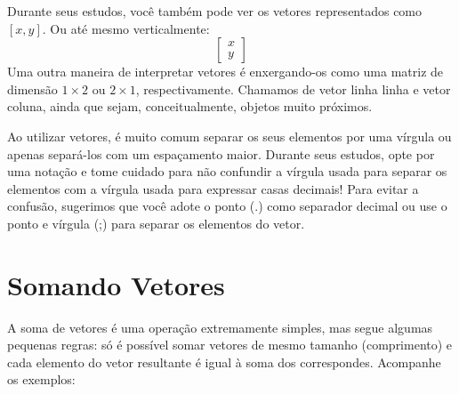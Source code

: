 \documentclass[
  portuguese,
  letterpaper,
  DIV=11,
  numbers=noendperiod]{scrreport}
\begin{document}
Durante seus estudos, você também pode ver os vetores representados como
\([x,y]\). Ou até mesmo verticalmente: \[
\begin{bmatrix}
  x  \\
  y 
\end{bmatrix}
\] Uma outra maneira de interpretar vetores é enxergando-os como uma
matriz de dimensão \(1 \times 2\) ou \(2 \times 1\), respectivamente.
Chamamos de vetor linha linha e vetor coluna, ainda que sejam,
conceitualmente, objetos muito próximos.

Ao utilizar vetores, é muito comum separar os seus elementos por uma
vírgula ou apenas separá-los com um espaçamento maior. Durante seus
estudos, opte por uma notação e tome cuidado para não confundir a
vírgula usada para separar os elementos com a vírgula usada para
expressar casas decimais! Para evitar a confusão, sugerimos que você
adote o ponto (.) como separador decimal ou use o ponto e vírgula (;)
para separar os elementos do vetor.

\section{Somando Vetores}\label{somando-vetores}

A soma de vetores é uma operação extremamente simples, mas segue algumas
pequenas regras: só é possível somar vetores de mesmo tamanho
(comprimento) e cada elemento do vetor resultante é igual à soma dos
correspondes. Acompanhe os exemplos:
\end{document}
